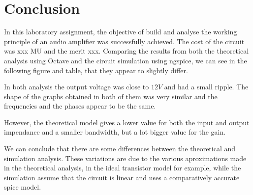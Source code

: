 \section{Conclusion}
\label{sec:conclusion}
In this laboratory assignment, the objective of build and analyse the working principle of an audio amplifier was successfully achieved.
The cost of the circuit was xxx MU and the merit xxx.
Comparing the results from both the theoretical analysis using Octave and the circuit simulation using ngspice, we can see in the following figure and table, that they appear to slightly differ.

In both analysis the output voltage was close to $12 V$ and had a small ripple. The shape of the graphs obtained in both of them was very similar and the frequencies and the phases appear to be the same.

However, the theoretical model gives a lower value for both the input and output impendance and a smaller bandwidth, but a lot bigger value for the gain. 

We can conclude that there are some differences between the theoretical and simulation analysis. These variations are due to the various aproximations made in the theoretical analysis, in the ideal transistor model for example, while the simulation assume that the circuit is linear and uses a comparatively accurate spice model.  



